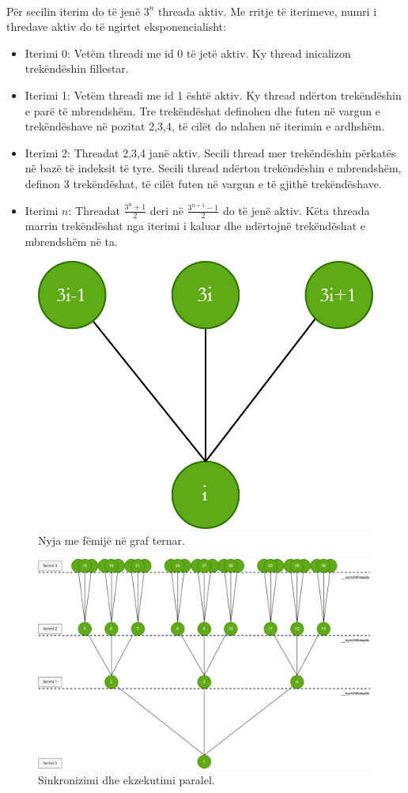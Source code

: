 \noindent \\ Për secilin iterim do të jenë \(3^n\) threada aktiv. Me rritje të iterimeve, numri i thredave aktiv do të ngirtet eksponencialisht:
\begin{itemize}
    \item Iterimi 0: Vetëm threadi me id 0 të jetë aktiv. Ky thread inicalizon trekëndëshin fillestar.
    \item Iterimi 1: Vetëm threadi me id 1 është aktiv. Ky thread ndërton trekëndëshin e parë të mbrendshëm. Tre trekëndëshat definohen dhe futen në vargun e trekëndëshave në pozitat 2,3,4, të cilët do ndahen në iterimin e ardhshëm.
    \item Iterimi  2: Threadat 2,3,4 janë aktiv. Secili thread mer trekëndëshin përkatës në bazë të indeksit të tyre. Secili thread ndërton trekëndëshin e mbrendshëm, definon 3 trekëndëshat, të cilët futen në vargun e të gjithë trekëndëshave.
    \item Iterimi \(n\): Threadat \(\frac{3^n + 1}{2}\) deri në \(\frac{3^{n+1} - 1}{2}\) do të jenë aktiv. Këta threada marrin trekëndëshat nga iterimi i kaluar dhe ndërtojnë trekëndëshat e mbrendshëm në ta.
\end{itemize}

\begin{figure}[]
    \centering
    \includegraphics[width=0.3\linewidth]{triangle_6.png}
    \caption{Nyja me fëmijë në graf ternar.}
    \label{fig:node_ternary}
\end{figure}

\begin{figure}[htpb]
    \centering
    \includegraphics[width=1\linewidth]{triangle_7.png}
    \caption{Sinkronizimi dhe ekzekutimi paralel.}
    \label{fig:sierpinski_parallel}
\end{figure}

